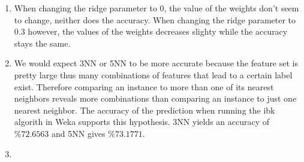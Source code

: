 \documentclass{article}
\begin{document}
\begin{enumerate}
\begin{enumerate}
                \item
	          When changing the ridge parameter to $0$, the value of the weights don't seem to 				change, neither does the accuracy.
		When changing the ridge parameter to $0.3$ however, the values of the weights 					decreases slighty while the accuracy stays the same. 
                \item
	          We would expect 3NN or 5NN to be more accurate because the feature set is pretty 				large thus many combinations of features that lead to a certain label exist. Therefore 				comparing an instance to more than one of its nearest neighbors reveals more 					combinations than comparing an instance to just one nearest neighbor. The accuracy of 			the prediction when running the ibk algorith in Weka supports this hypothesis. 3NN yields 		an accuracy of $\%72.6563$ and 5NN gives $\%73.1771$.
                \item
                    

\end{enumerate}
\end{enumerate}
\end{document}
